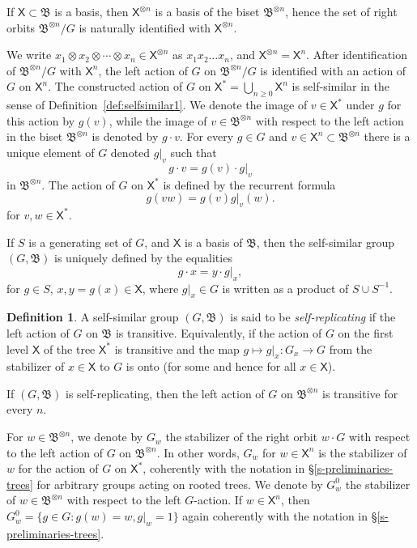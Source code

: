 \documentclass[11pt]{amsart}
\newcommand{\bim}{\mathfrak{B}}
\newcommand{\xs}{\alb^\ast}
\newcommand{\alb}{\ensuremath{\mathsf{X}}}%
\theoremstyle{definition}
\newtheorem{defin}{Definition}[section]
\theoremstyle{plain}
\newtheorem{main thm}{Theorem}
\theoremstyle{remark}
\theoremstyle{plain}
\begin{document}
If $\alb\subset\bim$ is a basis, then $\alb^{\otimes n}$ is a basis of the biset $\bim^{\otimes n}$, hence the set of right orbits $\bim^{\otimes n}/G$ is naturally identified with $\alb^{\otimes n}$. 

We write $x_1\otimes x_2\otimes\cdots\otimes x_n\in\alb^{\otimes n}$ as $x_1x_2\ldots x_n$, and $\alb^{\otimes n}=\alb^n$. After identification of $\bim^{\otimes n}/G$ with $\alb^n$, the left action of $G$ on $\bim^{\otimes n}/G$ is identified with an action of $G$ on $\alb^n$. The constructed action of $G$ on $\xs=\bigcup_{n\ge 0}\alb^n$ is self-similar in the sense of Definition~\ref{def:selfsimilar1}. We denote the image of $v\in\xs$ under $g$ for this action by $g(v)$, while the image of $v\in\bim^{\otimes n}$ with respect to the left action in the biset $\bim^{\otimes n}$ is denoted by $g\cdot v$. For every $g\in G$ and $v\in \alb^n\subset \bim^{\otimes n}$ there is a unique element of $G$ denoted $g|_v$ such that 
\[g\cdot v=g(v)\cdot g|_v\]
in $\bim^{\otimes n}$. The action of $G$ on $\xs$ is defined by the recurrent formula
\[g(vw)=g(v)g|_v(w).\]
for $v, w\in\xs$.

If $S$ is a generating set of $G$, and $\alb$ is a basis of $\bim$, then the self-similar group $(G, \bim)$ is uniquely defined by the equalities
\[g\cdot x=y\cdot g|_x,\]
for $g\in S$, $x, y=g(x)\in\alb$, where $g|_x\in G$ is written as a product of $S\cup S^{-1}$. 

\begin{defin}
    A self-similar group $(G, \bim)$ is said to be \emph{self-replicating} if the left action of $G$ on $\bim$ is transitive. Equivalently, if the action of $G$ on the first level $\alb$ of the tree $\xs$ is transitive and the map $g\mapsto g|_x\colon G_x\longrightarrow G$ from the stabilizer of $x\in\alb$ to $G$ is onto (for some and hence for all $x\in\alb$).
\end{defin}

If $(G, \bim)$ is self-replicating, then the left action of $G$ on $\bim^{\otimes n}$ is transitive for every $n$.

For $w\in\bim^{\otimes n}$, we denote by $G_w$ the stabilizer of the right orbit $w\cdot G$ with respect to the left action of $G$ on $\bim^{\otimes n}$. In other words, $G_w$ for $w\in\alb^n$ is the stabilizer of $w$ for the action of $G$ on $\xs$, coherently with the notation in \S\ref{s-preliminaries-trees} for arbitrary groups acting on rooted trees. We denote by $G_w^0$ the stabilizer of $w\in\bim^{\otimes n}$ with respect to the left $G$-action. If $w\in\alb^n$, then $G_w^0=\{g\in G\colon g(w)=w, g|_w=1\}$ again coherently with the notation in \S\ref{s-preliminaries-trees}.
\end{document}
